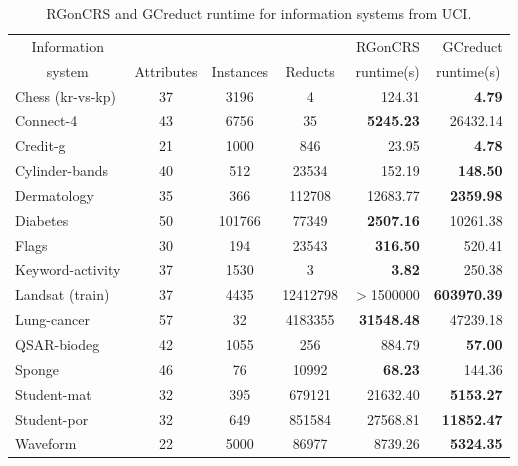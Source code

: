 \documentclass[number,preprint,review,12pt]{elsarticle}
\begin{document}
	\begin{table}[!htb]
		\caption{RGonCRS and GCreduct runtime for information systems from UCI.}\label{tab:matlab}
		\centering \footnotesize
		\begin{tabular}{|l|c|c|c|r|r|}
			\hline
			\multicolumn{1}{|c|}{Information}&&&& RGonCRS & GCreduct\\ 
			\multicolumn{1}{|c|}{system} & Attributes & Instances & Reducts & runtime(s) & \multicolumn{1}{c|}{runtime(s)}\\ 
			\hline
			Chess (kr-vs-kp)          & 37         & 3196      & 4        & 124.31            & \textbf{4.79}      \\
			Connect-4                 & 43         & 6756      & 35       & \textbf{5245.23}  & 26432.14           \\
			Credit-g                  & 21         & 1000      & 846      & 23.95             & \textbf{4.78}      \\
			Cylinder-bands            & 40         & 512       & 23534    & 152.19            & \textbf{148.50}    \\
			Dermatology               & 35         & 366       & 112708   & 12683.77          & \textbf{2359.98}   \\
			Diabetes                  & 50         & 101766    & 77349    & \textbf{2507.16}  & 10261.38           \\
			Flags                     & 30         & 194       & 23543    & \textbf{316.50}   & 520.41             \\
			Keyword-activity          & 37         & 1530      & 3        & \textbf{3.82}     & 250.38             \\
			Landsat (train)           & 37         & 4435      & 12412798 & $>$1500000        & \textbf{603970.39} \\
			Lung-cancer               & 57         & 32        & 4183355  & \textbf{31548.48} & 47239.18           \\
			QSAR-biodeg               & 42         & 1055      & 256      &  884.79           & \textbf{57.00}     \\
			Sponge                    & 46         & 76        & 10992    & \textbf{68.23}    & 144.36             \\
			Student-mat               & 32         & 395       & 679121   & 21632.40          & \textbf{5153.27}   \\
			Student-por               & 32         & 649       & 851584   & 27568.81          & \textbf{11852.47}  \\
			Waveform                  & 22         & 5000      & 86977    & 8739.26           & \textbf{5324.35}   \\				
			\hline
    	\end{tabular}
    \end{table}
    	
\end{document}
